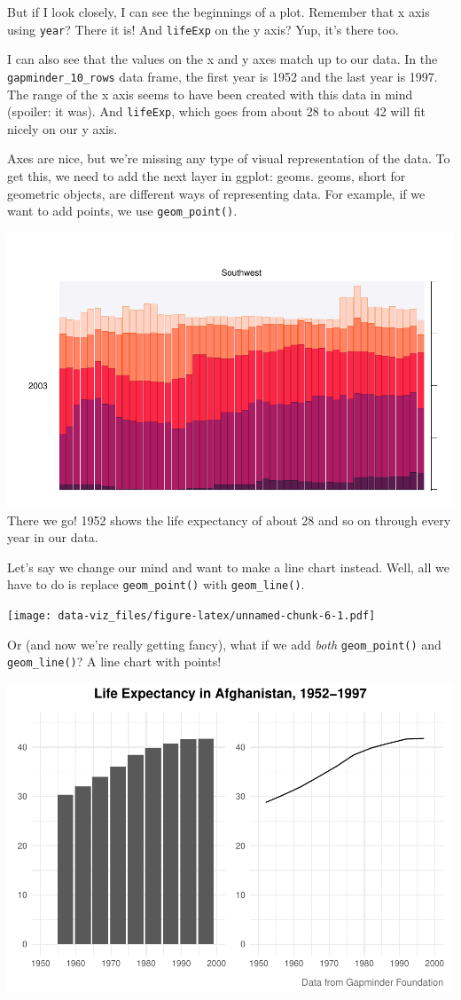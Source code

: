 \documentclass[
]{book}
\begin{document}
But if I look closely, I can see the beginnings of a plot. Remember that x axis using \texttt{year}? There it is! And \texttt{lifeExp} on the y axis? Yup, it's there too.

I can also see that the values on the x and y axes match up to our data. In the \texttt{gapminder\_10\_rows} data frame, the first year is 1952 and the last year is 1997. The range of the x axis seems to have been created with this data in mind (spoiler: it was). And \texttt{lifeExp}, which goes from about 28 to about 42 will fit nicely on our y axis.

Axes are nice, but we're missing any type of visual representation of the data. To get this, we need to add the next layer in ggplot: geoms. geoms, short for geometric objects, are different ways of representing data. For example, if we want to add points, we use \texttt{geom\_point()}.

\includegraphics{data-viz_files/figure-latex/unnamed-chunk-5-1.pdf}
There we go! 1952 shows the life expectancy of about 28 and so on through every year in our data.

Let's say we change our mind and want to make a line chart instead. Well, all we have to do is replace \texttt{geom\_point()} with \texttt{geom\_line()}.

\texttt{[image: data-viz\_files/figure-latex/unnamed-chunk-6-1.pdf]}

Or (and now we're really getting fancy), what if we add \emph{both} \texttt{geom\_point()} and \texttt{geom\_line()}? A line chart with points!

\includegraphics{data-viz_files/figure-latex/unnamed-chunk-7-1.pdf}
\end{document}
